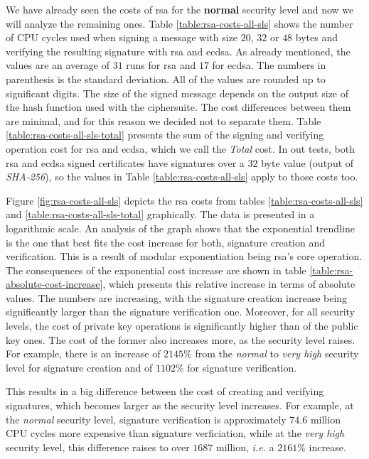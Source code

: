 We have already seen the costs of \gls{rsa} for the \textbf{normal} security level and now we will analyze the
remaining ones. Table \ref{table:rsa-costs-all-sls} shows the number of CPU cycles used
when signing a message with size $20$, $32$ or $48$ bytes and verifying the resulting signature with \gls{rsa} and \gls{ecdsa}.
As already mentioned, the values are an average of $31$ runs for \gls{rsa} and $17$ for \gls{ecdsa}.
The numbers in parenthesis is the standard deviation. All of the values are rounded up to significant digits. The size of the signed message depends on the output size of the
hash function used with the ciphersuite. The cost differences between them are minimal, and for this reason we decided not to separate them.
Table \ref{table:rsa-costs-all-sls-total} presents the sum of the signing and verifying operation cost for \gls{rsa} and \gls{ecdsa}, which we call the \textit{Total} cost.
In out tests, both \gls{rsa} and \gls{ecdsa} signed certificates have signatures over a $32$ byte value (output of \textit{SHA-256}), so
the values in Table \ref{table:rsa-costs-all-sls} apply to those costs too.

Figure \ref{fig:rsa-costs-all-sls} depicts the \gls{rsa} costs from tables \ref{table:rsa-costs-all-sls} and \ref{table:rsa-costs-all-sls-total} graphically. 
The data is presented in a logarithmic
scale. An analysis of the graph shows that the exponential trendline is the one that best fits the cost increase for both, signature creation and
verification. This is a result of modular exponentiation being \gls{rsa}'s core operation. 
The consequences of the exponential cost increase are shown in table \ref{table:rsa-absolute-cost-increase}, which presents this relative increase
in terms of absolute values. The numbers are increasing, with the signature creation increase being significantly larger
than the signature verification one.
Moreover, for all security levels, the cost of
private key operations is significantly higher than
of the public key ones. The cost of the former also increases more, as the security level raises. For example, there is an increase
of $2145\%$ from the \textit{normal} to \textit{very high} security level for signature creation and of $1102\%$ for signature verification.

This results in a big difference between the cost of creating and verifying signatures, which becomes larger as the security level increases.
For example, at the \textit{normal} security level, signature verification is approximately $74.6$ million CPU cycles more expensive than signature verficiation,
while at the \textit{very high} security level, this difference raises to over $1687$ million, \textit{i.e.} a $2161\%$ increase.

